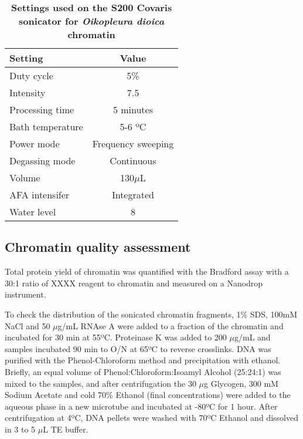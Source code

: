 \documentclass[11pt,twoside,a4paper]{report}
\begin{document}
			\begin{table}[!ht]
        		\caption{\bf{Settings used on the S200 Covaris sonicator for \textit{Oikopleura dioica} chromatin}}
        		\begin{center}
        		\begin{tabular}{|l|c|}
            		\hline
	           		\textbf{Setting} & \textbf{Value}\\
        		    \hline
	        		Duty cycle& 5\%\\
	        		\hline
            	    Intensity & 7.5\\
	        		\hline
					Processing time & 5 minutes\\
	        		\hline
	        		Bath temperature & 5-6 ºC\\
	        		\hline
					Power mode & Frequency sweeping\\
	        		\hline
	        		Degassing mode & Continuous\\
	        		\hline
	        		Volume & 130$\mu$L\\
	        		\hline
	        		AFA intensifer & Integrated\\
	        		\hline
	        		Water level & 8\\
	        		\hline        		
	        \end{tabular}
    		    \end{center}
	        \label{table:CovarisSettings}
		    \end{table}
			
			\subsection{Chromatin quality assessment}
			\label{section:chromQualityAssess}
			Total protein yield of chromatin was quantified with the Bradford assay with a 30:1 ratio of XXXX reagent to chromatin and measured on a Nanodrop instrument.
			
			To check the distribution of the sonicated chromatin fragments, 1\% SDS, 100mM NaCl and 50 $\mu$g/mL RNAse A were added to a fraction of the chromatin and incubated for 30 min at 55ºC. Proteinase K was added to 200 $\mu$g/mL and samples incubated 90 min to O/N at 65ºC to reverse crosslinks. DNA was purified with the Phenol-Chloroform method and precipitation with ethanol. Briefly, an equal volume of Phenol:Chloroform:Isoamyl Alcohol (25:24:1) was mixed to the samples, and after centrifugation the 30 $\mu$g Glycogen, 300 mM Sodium Acetate and cold 70\% Ethanol (final concentrations) were added to the aqueous phase in a new microtube and incubated at -80ºC for 1 hour. After centrifugation at 4ºC, DNA pellets were washed with 70ºC Ethanol and dissolved in 3 to 5 $\mu$L TE buffer. \\
			
\end{document}
